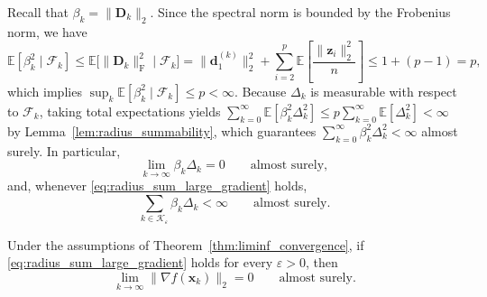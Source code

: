 \documentclass{siamart171218}
\newcommand{\bx}{\bm{x}}
\newcommand{\bd}{\bm{d}}
\newcommand{\bz}{\bm{z}}
\begin{document}
Recall that $\beta_k = \|\bm D_k\|_2$. Since the spectral norm is bounded by the Frobenius norm, we have
\[
\mathbb E[\beta_k^2\mid\mathcal F_k] \le \mathbb E\bigl[\|\bm D_k\|_{\mathrm{F}}^2 \;\big|\; \mathcal F_k\bigr] = \|\bd_1^{(k)}\|_2^2 + \sum_{i=2}^p \mathbb E\left[\frac{\|\bz_i\|_2^2}{n}\right] \le 1 + (p-1) = p,
\]
which implies $\sup_k \mathbb E[\beta_k^2\mid\mathcal F_k] \le p < \infty$. Because $\Delta_k$ is measurable with respect to $\mathcal F_k$, taking total expectations yields $\sum_{k=0}^{\infty} \mathbb E[\beta_k^2 \Delta_k^2] \le p \sum_{k=0}^{\infty} \mathbb E[\Delta_k^2] < \infty$ by Lemma~\ref{lem:radius_summability}, which guarantees $\sum_{k=0}^{\infty} \beta_k^2 \Delta_k^2 < \infty$ almost surely. In particular,
\begin{equation}
\label{eq:actual_step_decay}
\lim_{k\to\infty} \beta_k\Delta_k = 0 \qquad \text{almost surely},
\end{equation}
and, whenever \eqref{eq:radius_sum_large_gradient} holds,
\begin{equation}
\label{eq:actual_step_sum}
\sum_{k\in\mathcal K_\varepsilon} \beta_k\Delta_k < \infty \qquad \text{almost surely}.
\end{equation}

\begin{theorem}
\label{thm:global_convergence}
Under the assumptions of Theorem~\ref{thm:liminf_convergence}, if \eqref{eq:radius_sum_large_gradient} holds for every $\varepsilon>0$, then
\begin{equation}
\label{eq:gradient_convergence}
\lim_{k\to\infty} \|\nabla f(\bx_k)\|_2 = 0 \qquad \text{almost surely}.
\end{equation}
\end{theorem}
\end{document}
